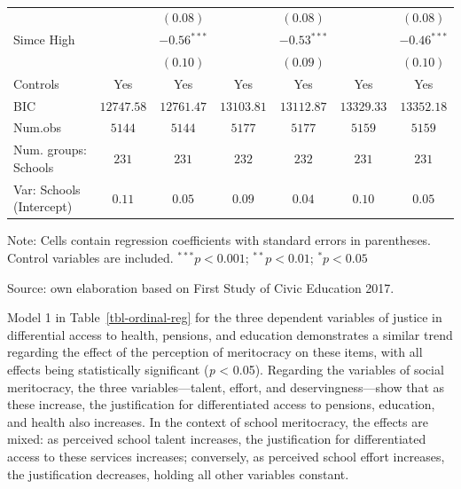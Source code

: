 \documentclass[
  12pt,
  letterpaper,
]{article}
\begin{document}
\begin{table}
{\begin{center}
{\begin{threeparttable}
\begin{tabular}{l c c c c c c}
                                          &               & $(0.08)$      &               & $(0.08)$      &               & $(0.08)$      \\
\quad Simce High                          &               & $-0.56^{***}$ &               & $-0.53^{***}$ &               & $-0.46^{***}$ \\
                                          &               & $(0.10)$      &               & $(0.09)$      &               & $(0.10)$      \\
\midrule
Controls                                  & Yes           & Yes           & Yes           & Yes           & Yes           & Yes           \\
BIC                                       & $12747.58$    & $12761.47$    & $13103.81$    & $13112.87$    & $13329.33$    & $13352.18$    \\
Num.obs                                   & $5144$        & $5144$        & $5177$        & $5177$        & $5159$        & $5159$        \\
Num. groups: Schools                      & $231$         & $231$         & $232$         & $232$         & $231$         & $231$         \\
Var: Schools (Intercept)                  & $0.11$        & $0.05$        & $0.09$        & $0.04$        & $0.10$        & $0.05$        \\
\bottomrule
\end{tabular}
\begin{tablenotes}[flushleft]
\scriptsize{\item Note: Cells contain regression coefficients with standard errors in parentheses. Control variables are included. $^{***}p<0.001$; $^{**}p<0.01$; $^{*}p<0.05$ \\ \item Source: own elaboration based on First Study of Civic Education 2017.}
\end{tablenotes}
\end{threeparttable}
}
\caption{}
\label{table:coefficients}
\end{center}

}

\end{table}%

Model 1 in Table~\ref{tbl-ordinal-reg} for the three dependent variables
of justice in differential access to health, pensions, and education
demonstrates a similar trend regarding the effect of the perception of
meritocracy on these items, with all effects being statistically
significant (\emph{p} \textless{} 0.05). Regarding the variables of
social meritocracy, the three variables---talent, effort, and
deservingness---show that as these increase, the justification for
differentiated access to pensions, education, and health also increases.
In the context of school meritocracy, the effects are mixed: as
perceived school talent increases, the justification for differentiated
access to these services increases; conversely, as perceived school
effort increases, the justification decreases, holding all other
variables constant.
\end{document}
